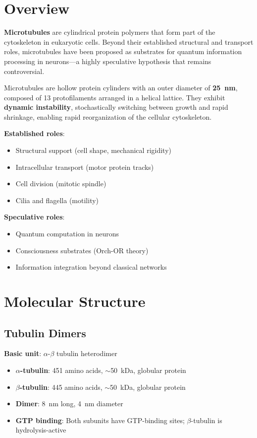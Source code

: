 \section{Overview}
\label{sec:overview}

\textbf{Microtubules} are cylindrical protein polymers that form part of the cytoskeleton in eukaryotic cells. Beyond their established structural and transport roles, microtubules have been proposed as substrates for quantum information processing in neurons---a highly speculative hypothesis that remains controversial.

\begin{keyconcept}
Microtubules are hollow protein cylinders with an outer diameter of \textbf{25~nm}, composed of 13 protofilaments arranged in a helical lattice. They exhibit \textbf{dynamic instability}, stochastically switching between growth and rapid shrinkage, enabling rapid reorganization of the cellular cytoskeleton.
\end{keyconcept}

\textbf{Established roles}:
\begin{itemize}
\item Structural support (cell shape, mechanical rigidity)
\item Intracellular transport (motor protein tracks)
\item Cell division (mitotic spindle)
\item Cilia and flagella (motility)
\end{itemize}

\textbf{Speculative roles}:
\begin{itemize}
\item Quantum computation in neurons
\item Consciousness substrates (Orch-OR theory)
\item Information integration beyond classical networks
\end{itemize}

\section{Molecular Structure}
\label{sec:molecular-structure}

\subsection{Tubulin Dimers}
\label{subsec:tubulin-dimers}

\textbf{Basic unit}: $\alpha$-$\beta$ tubulin heterodimer
\begin{itemize}
\item \textbf{$\alpha$-tubulin}: 451 amino acids, $\sim$50~kDa, globular protein
\item \textbf{$\beta$-tubulin}: 445 amino acids, $\sim$50~kDa, globular protein
\item \textbf{Dimer}: 8~nm long, 4~nm diameter
\item \textbf{GTP binding}: Both subunits have GTP-binding sites; $\beta$-tubulin is hydrolysis-active
\end{itemize}

